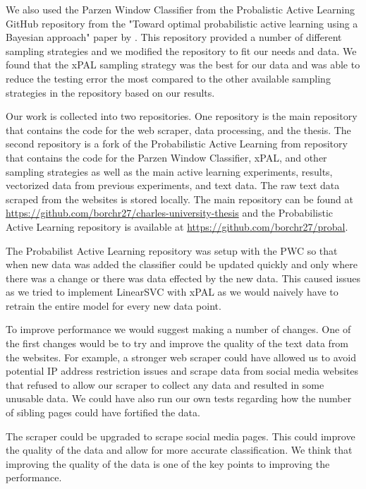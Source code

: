 We also used the Parzen Window Classifier from the Probalistic Active Learning GitHub repository from the "Toward optimal probabilistic active learning using a Bayesian approach" paper by \cite{kottke2021toward}. This repository provided a number of different sampling strategies and we modified the repository to fit our needs and data. We found that the xPAL sampling strategy was the best for our data and was able to reduce the testing error the most compared to the other available sampling strategies in the repository based on our results.

Our work is collected into two repositories. One repository is the main repository that contains the code for the web scraper, data processing, and the thesis. The second repository is a fork of the Probabilistic Active Learning from \cite{kottke2021toward} repository that contains the code for the Parzen Window Classifier, xPAL, and other sampling strategies as well as the main active learning experiments, results, vectorized data from previous experiments, and text data. The raw text data scraped from the websites is stored locally. The main repository can be found at \url{https://github.com/borchr27/charles-university-thesis} and the Probabilistic Active Learning repository is available at \url{https://github.com/borchr27/probal}.

The Probabilist Active Learning repository was setup with the PWC so that when new data was added the classifier could be updated quickly and only where there was a change or there was data effected by the new data. This caused issues as we tried to implement LinearSVC with xPAL as we would naively have to retrain the entire model for every new data point.

To improve performance we would suggest making a number of changes. One of the first changes would be to try and improve the quality of the text data from the websites. For example, a stronger web scraper could have allowed us to avoid potential IP address restriction issues and scrape data from social media websites that refused to allow our scraper to collect any data and resulted in some unusable data. We could have also run our own tests regarding how the number of sibling pages could have fortified the data.

The scraper could be upgraded to scrape social media pages. This could improve the quality of the data and allow for more accurate classification. We think that improving the quality of the data is one of the key points to improving the performance.

